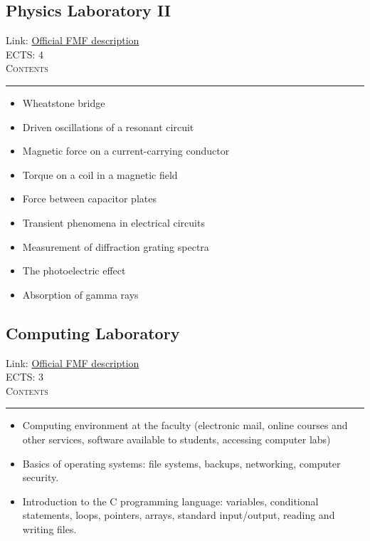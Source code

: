 \documentclass[11pt, a4paper]{article}
\newenvironment{course}[3]{
\subsection{#1}%
Link: \href{#2}{Official FMF description}\\%
ECTS: #3%
\vspace{1ex}
\\
{\large \textsc{Contents}}\\[-0.9ex]%
\rule{\textwidth}{0.5pt}
\vspace{-3ex}
}
{}
\newenvironment{chapter}[1]{
\begin{tcolorbox}[title=#1, breakable]
}
{\end{tcolorbox}}
\begin{document}
\begin{course}{Physics Laboratory II}{https://www.fmf.uni-lj.si/en/study-physics/programmes/1fiz/2020/7000777/courses/1143/}{4}
    \label{physics_laboratory_2}

    \begin{chapter}{Experiments}
        \begin{itemize}
        
            \item Wheatstone bridge

            \item Driven oscillations of a resonant circuit

            \item Magnetic force on a current-carrying conductor

            \item Torque on a coil in a magnetic field

            \item Force between capacitor plates

            \item Transient phenomena in electrical circuits

            \item Measurement of diffraction grating spectra

            \item The photoelectric effect

            \item Absorption of gamma rays
        
        \end{itemize}
    \end{chapter}
\end{course}

\begin{course}{Computing Laboratory}{https://www.fmf.uni-lj.si/en/study-physics/programmes/1fiz/2018/7000777/courses/525/}{3}
    \label{computing_laboratory}

    \begin{chapter}{Material}
        \begin{itemize}
        
            \item Computing environment at the faculty (electronic mail, online courses and other services, software available to students, accessing computer labs)

            \item Basics of operating systems: file systems, backups, networking, computer security.

            \item Introduction to the C programming language: variables, conditional statements, loops, pointers, arrays, standard input/output, reading and writing files.
        
        \end{itemize}
    \end{chapter}
\end{course}
\end{document}
